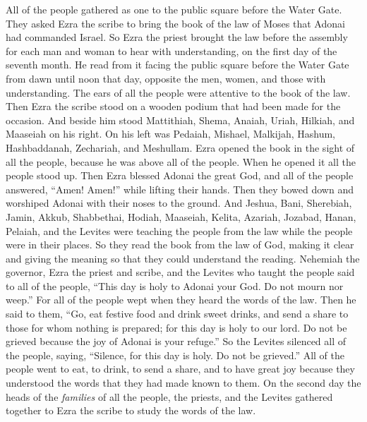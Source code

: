 \begin{biblechapter} %
 All of the people gathered as one to the public square before the Water Gate. They asked Ezra the scribe to bring the book of the law of Moses that Adonai had commanded Israel.
\verse So Ezra the priest brought the law before the assembly for each man and woman to hear with understanding, on the first day of the seventh month.
\verse He read from it facing the public square before the Water Gate from dawn until noon that day, opposite the men, women, and those with understanding. The ears of all the people were attentive to the book of the law.
\verse Then Ezra the scribe stood on a wooden podium that had been made for the occasion. And beside him stood Mattithiah, Shema, Anaiah, Uriah, Hilkiah, and Maaseiah on his right. On his left was Pedaiah, Mishael, Malkijah, Hashum, Hashbaddanah, Zechariah, and Meshullam.
\verse Ezra opened the book in the sight of all the people, because he was above all of the people. When he opened it all the people stood up.
\verse Then Ezra blessed Adonai the great God, and all of the people answered, “Amen! Amen!” while lifting their hands. Then they bowed down and worshiped Adonai with their noses to the ground.
\verse And Jeshua, Bani, Sherebiah, Jamin, Akkub, Shabbethai, Hodiah, Maaseiah, Kelita, Azariah, Jozabad, Hanan, Pelaiah, and the Levites were teaching the people from the law while the people were in their places.
\verse So they read the book from the law of God, making it clear and giving the meaning so that they could understand the reading.
\verse Nehemiah the governor, Ezra the priest and scribe, and the Levites who taught the people said to all of the people, “This day is holy to Adonai your God. Do not mourn nor weep.” For all of the people wept when they heard the words of the law.
\verse Then he said to them, “Go, eat festive food and drink sweet drinks, and send a share to those for whom nothing is prepared; for this day is holy to our lord. Do not be grieved because the joy of Adonai is your refuge.”
\verse So the Levites silenced all of the people, saying, “Silence, for this day is holy. Do not be grieved.”
\verse All of the people went to eat, to drink, to send a share, and to have great joy because they understood the words that they had made known to them.
 On the second day the heads of the \textit{families} of all the people, the priests, and the Levites gathered together to Ezra the scribe to study the words of the law.

\end{biblechapter}
